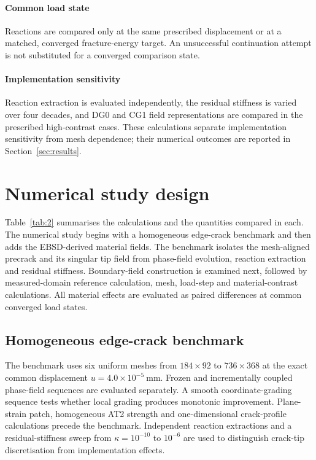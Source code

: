 \documentclass[preprint,12pt]{elsarticle}
\begin{document}
\paragraph{Common load state}
Reactions are compared only at the same prescribed displacement or at a matched,
converged fracture-energy target. An unsuccessful continuation attempt is not
substituted for a converged comparison state.

\paragraph{Implementation sensitivity}
Reaction extraction is evaluated independently, the residual stiffness is varied
over four decades, and DG0 and CG1 field representations are compared in the
prescribed high-contrast cases. These calculations separate implementation
sensitivity from mesh dependence; their numerical outcomes are reported in
Section~\ref{sec:results}.

\section{Numerical study design}

Table~\ref{tab:2} summarises the calculations and the quantities compared in each.
The numerical study begins with a homogeneous edge-crack benchmark and then adds
the EBSD-derived material fields. The benchmark isolates the mesh-aligned
precrack and its singular tip field from phase-field evolution, reaction
extraction and residual stiffness. Boundary-field construction is examined next,
followed by measured-domain reference calculation, mesh, load-step and material-contrast
calculations. All material effects are evaluated as paired differences at common
converged load states.

\subsection{Homogeneous edge-crack benchmark}
The benchmark uses six uniform meshes from \(184\times92\) to \(736\times368\)
at the exact common displacement \(u=4.0\times10^{-5}\ \mathrm{mm}\). Frozen
and incrementally coupled phase-field sequences are evaluated separately. A
smooth coordinate-grading sequence tests whether local grading produces monotonic
improvement. Plane-strain patch, homogeneous AT2 strength and one-dimensional
crack-profile calculations precede the benchmark. Independent reaction
extractions and a residual-stiffness sweep from \(\kappa=10^{-10}\) to
\(10^{-6}\) are used to distinguish crack-tip discretisation from implementation
effects.
\end{document}
